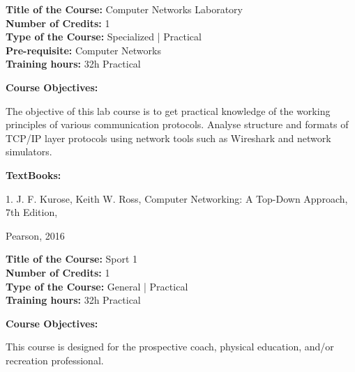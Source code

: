 \documentclass[12pt,a4paper]{article}
\begin{document}
\newpage
\textbf{Title of the Course:} Computer Networks Laboratory\\
\textbf{Number of Credits:} 1\\
\textbf{Type of the Course:} Specialized | Practical\\
\textbf{Pre-requisite:} Computer Networks\\
\textbf{Training hours:} 32h Practical\par\vspace{4pt}
\textbf{Course Objectives:}\par\vspace{2pt}
The objective of this lab course is to get practical knowledge of the working principles of various
communication protocols. Analyse structure and formats of TCP/IP layer protocols using network
tools such as Wireshark and network simulators.\par\vspace{4pt}
\textbf{TextBooks:}\par\vspace{2pt}
1. J. F. Kurose, Keith W. Ross, Computer Networking: A Top-Down Approach, 7th Edition,\par
Pearson, 2016\par
\vspace{4pt}

\newpage
\nopagebreak
\textbf{Title of the Course:} Sport 1\\
\textbf{Number of Credits:} 1\\
\textbf{Type of the Course:} General | Practical\\
\textbf{Training hours:} 32h Practical\par\vspace{4pt}
\textbf{Course Objectives:}\par\vspace{2pt}
This course is designed for the prospective coach, physical education, and/or recreation
professional.\par\vspace{4pt}
\end{document}
